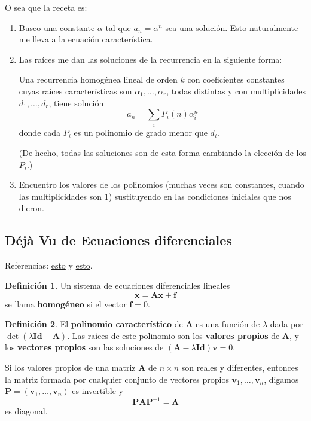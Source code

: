 \documentclass[spanish]{book}
\theoremstyle{definition}
\newtheorem*{defn}{Definición}
\begin{document}
	O sea que la receta es:
	\begin{enumerate}
		\item Busco una constante $\alpha$ tal que $a_n=\alpha^n$ sea una solución. Esto naturalmente me lleva a la ecuación característica.
		\item Las raíces me dan las soluciones de la recurrencia en la siguiente forma:
	\begin{teo}
		Una recurrencia homogénea lineal de orden $k$ con coeficientes constantes cuyas raíces características son $\alpha_1,\ldots,\alpha_r$, todas distintas y con multiplicidades $d_1,\ldots,d_r$, tiene solución
		\[a_n=\sum_iP_i(n)\alpha_i^n\]
		donde cada $P_i$ es un polinomio de grado menor que $d_i$.
	\end{teo}
	(De hecho, todas las soluciones son de esta forma cambiando la elección de los $P_i$.)
	\item Encuentro los valores de los polinomios (muchas veces son constantes, cuando las multiplicidades son 1) sustituyendo en las condiciones iniciales que nos dieron.
\end{enumerate}	

\iffalse
\subsection{Déjà Vu de Ecuaciones diferenciales}
	Referencias: \href{http://www.cds.caltech.edu/~murray/courses/cds101/fa02/precourse/delvecchio-26sep02.pdf}{esto} y \href{https://tutorial.math.lamar.edu/Classes/DE/SolutionsToSystems.aspx#mjx-eqn-eqeq1}{esto}.
	\begin{defn}Un sistema de ecuaciones diferenciales lineales
	\begin{equation}\label{ec:2.2.1.1}
		\dot{\mathbf{x}}=\mathbf{A}\mathbf{x}+\mathbf{f}
	\end{equation}
	se llama \textbf{homogéneo} si el vector $\mathbf{f}=0$.
	\end{defn}

	\begin{defn}El \textbf{polinomio característico} de $\mathbf{A}$ es una función de $\lambda$ dada por $\det(\lambda \mathbf{Id}-\mathbf{A})$. Las raíces de este polinomio son los \textbf{valores propios} de $\mathbf{A}$, y los \textbf{vectores propios} son las soluciones de $(\mathbf{A}-\lambda \mathbf{Id})\mathbf{v}=0$.
	\end{defn}
	\begin{teo}
		Si los valores propios de una matriz $\mathbf{A}$ de $n\times n$ son reales y diferentes, entonces la matriz formada por cualquier conjunto de vectores propios $\mathbf{v}_1,\ldots,\mathbf{v}_n$, digamos $\mathbf{P}=(\mathbf{v}_1,\ldots,\mathbf{v}_n)$ es invertible y
			\[\mathbf{PAP}^{-1}=\mathbf{\Lambda}\]
		es diagonal.
	\end{teo}
	
\end{document}

